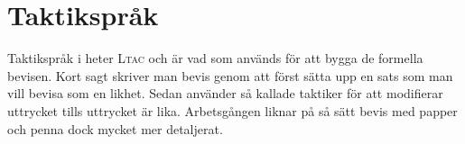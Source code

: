 \section{Taktikspråk}
Taktikspråk i \coq{} heter \textsc{Ltac} och är vad som används för att bygga de
formella bevisen. Kort sagt skriver man bevis genom att först sätta upp en sats
som man vill bevisa som en likhet. Sedan använder så kallade taktiker för att
modifierar uttrycket tills uttrycket är lika. Arbetsgången liknar på så sätt
bevis med papper och penna dock mycket mer detaljerat.

